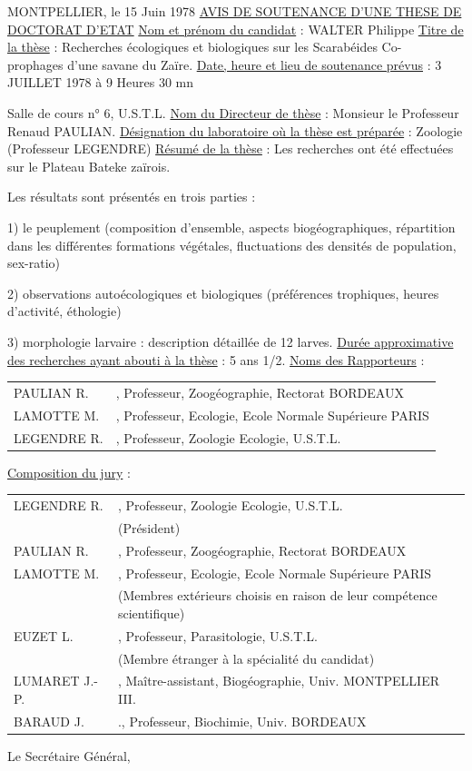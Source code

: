 MONTPELLIER, le 15 Juin 1978
\uline{AVIS DE SOUTENANCE D'UNE THESE DE DOCTORAT D'ETAT}
\uline{Nom et prénom du candidat} : WALTER Philippe
\uline{Titre de la thèse} : Recherches écologiques et biologiques sur les Scarabéides Co-\\
prophages d'une savane du Zaïre.
\uline{Date, heure et lieu de soutenance prévus} : 3 JUILLET 1978 à 9 Heures 30 mn

Salle de cours n° 6, U.S.T.L.
\uline{Nom du Directeur de thèse} : Monsieur le Professeur Renaud PAULIAN.
\uline{Désignation du laboratoire où la thèse est préparée} : Zoologie (Professeur LEGENDRE)
\uline{Résumé de la thèse} : Les recherches ont été effectuées sur le Plateau Bateke zaïrois.

Les résultats sont présentés en trois parties :

1) le peuplement (composition d'ensemble, aspects biogéographiques, répartition dans les différentes formations végétales, fluctuations des densités de population, sex-ratio)

2) observations autoécologiques et biologiques (préférences trophiques, heures d'activité, éthologie)

3) morphologie larvaire : description détaillée de 12 larves.
\uline{Durée approximative des recherches ayant abouti à la thèse} : 5 ans 1/2.
\uline{Noms des Rapporteurs} :

\begin{tabular}{ll}
PAULIAN R. & , Professeur, Zoogéographie, Rectorat BORDEAUX\\
LAMOTTE M. & , Professeur, Ecologie, Ecole Normale Supérieure PARIS\\
LEGENDRE R. & , Professeur, Zoologie Ecologie, U.S.T.L.
\end{tabular}
\uline{Composition du jury} :

\begin{tabular}{lp{.75\linewidth}}
LEGENDRE R. & , Professeur, Zoologie Ecologie, U.S.T.L.\\
& (Président)\\[1ex]
PAULIAN R. & , Professeur, Zoogéographie, Rectorat BORDEAUX\\
LAMOTTE M. & , Professeur, Ecologie, Ecole Normale Supérieure PARIS\\
& (Membres extérieurs choisis en raison de leur compétence scientifique)\\[1ex]
EUZET L. & , Professeur, Parasitologie, U.S.T.L.\\
& (Membre étranger à la spécialité du candidat)\\
LUMARET J.-P. & , Maître-assistant, Biogéographie, Univ. MONTPELLIER III.\\
BARAUD J. & ., Professeur, Biochimie, Univ. BORDEAUX
\end{tabular}
Le Secrétaire Général,

